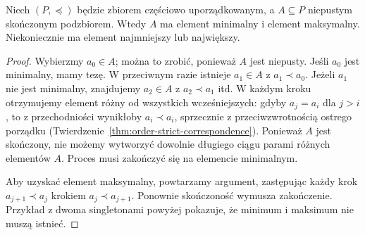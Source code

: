\begin{twierdzenie}
\label{thm:finite-poset-extrema}
Niech $(P,\preceq)$ będzie zbiorem częściowo
uporządkowanym, a $A\subseteq P$ niepustym skończonym
podzbiorem. Wtedy $A$ ma element minimalny i element
maksymalny. Niekoniecznie ma element najmniejszy lub
największy.
\end{twierdzenie}
\begin{proof}
Wybierzmy $a_0\in A$; można to zrobić, ponieważ $A$
jest niepusty. Jeśli $a_0$ jest minimalny, mamy tezę.
W przeciwnym razie istnieje $a_1\in A$ z
$a_1\prec a_0$. Jeżeli $a_1$ nie jest minimalny,
znajdujemy $a_2\in A$ z $a_2\prec a_1$ itd.
W każdym kroku otrzymujemy element różny od wszystkich
wcześniejszych: gdyby $a_j=a_i$ dla $j>i$, to z
przechodniości wynikłoby $a_i\prec a_i$, sprzecznie
z przeciwzwrotnością ostrego porządku
(Twierdzenie~\ref{thm:order-strict-correspondence}).
Ponieważ $A$ jest skończony, nie możemy wytworzyć
dowolnie długiego ciągu parami różnych elementów $A$.
Proces musi zakończyć się na elemencie minimalnym.

Aby uzyskać element maksymalny, powtarzamy argument,
zastępując każdy krok $a_{j+1}\prec a_j$ krokiem
$a_j\prec a_{j+1}$. Ponownie skończoność wymusza
zakończenie. Przykład z dwoma singletonami powyżej
pokazuje, że minimum i maksimum nie muszą istnieć.
\end{proof}


